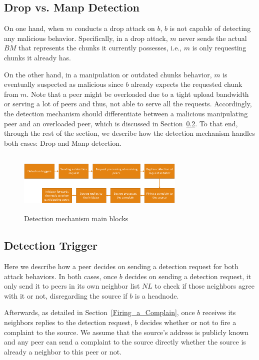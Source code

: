 \subsection{Drop vs. Manp Detection}

On one hand, when $m$ conducts a drop attack on $b$, $b$ is not capable of detecting any malicious behavior.
Specifically, in a drop attack, $m$ never sends the actual $BM$ that represents the chunks it currently possesses, i.e., $m$ is only requesting chunks it already has.

On the other hand, in a manipulation or outdated chunks behavior, $m$ is eventually suspected as malicious since $b$ already expects the requested chunk from $m$.
Note that a peer might be overloaded due to a tight upload bandwidth or serving a lot of peers and thus, not able to serve all the requests.
Accordingly, the detection mechanism should differentiate between a malicious manipulating peer and an overloaded peer, which is discussed in Section~\ref{Detection-Trigger}.
To that end, through the rest of the section, we describe how the detection mechanism handles both cases: Drop and Manp detection.

\begin{figure}
 \centering
 \includegraphics[width=8cm,height=3cm]{./Figures/detection-blocks.eps}
  \caption{Detection mechanism main blocks}
\label{detection-blocks} 
\end{figure}

\subsection{Detection Trigger}
\label{Detection-Trigger}
Here we describe how a peer decides on sending a detection request for both attack behaviors.
In both cases, once $b$ decides on sending a detection request, it only send it to peers in its own neighbor list $NL$ to check if those neighbors agree with it or not, disregarding the source if $b$ is a headnode.

Afterwards, as detailed in Section~\ref{Firing_a_Complain}, once $b$ receives its neighbors replies to the detection request, $b$ decides whether or not to fire a complaint to the source.
We assume that the source's address is publicly known and any peer can send a complaint to the source directly whether the source is already a neighbor to this peer or not.
